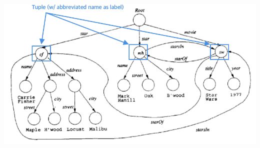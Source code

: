 \documentclass[12pt]{article}
\begin{document}
\begin{enumerate}[1.]
\begin{itemize}
\begin{itemize}
        \begin{center}
        \includegraphics[width=\linewidth]{images/worksheet_9_solution_2.png}
        \end{center}

        \end{itemize}
    \end{itemize}
\end{enumerate}
\end{document}
